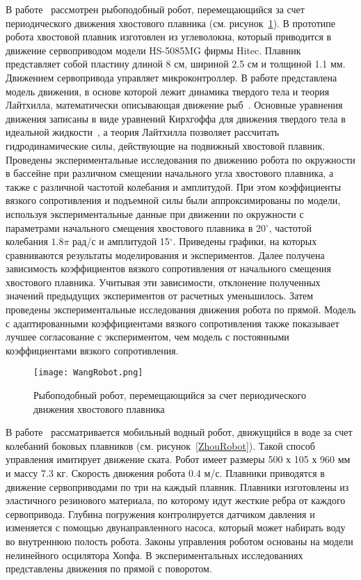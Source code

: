 В работе~\cite{Wang_Tan} рассмотрен рыбоподобный робот, перемещающийся за счет периодического движения хвостового плавника (см. рисунок~\ref{WangRobot}). В прототипе робота хвостовой плавник изготовлен из углеволокна, который приводится в движение сервоприводом модели HS-5085MG фирмы Hitec. Плавник представляет собой пластину длиной 8 см, шириной 2.5 см и толщиной 1.1 мм. Движением сервопривода управляет микроконтроллер. В работе представлена модель движения, в основе которой лежит  динамика твердого тела и теория Лайтхилла, математически описывающая движение рыб~\cite{Lighthill_1970}. Основные уравнения движения записаны в виде уравнений Кирхгоффа для движения твердого тела в идеальной жидкости~\cite{Kirchhoff}, а теория Лайтхилла позволяет рассчитать гидродинамические силы, действующие на подвижный хвостовой плавник. Проведены экспериментальные исследования по движению робота по окружности в бассейне при различном смещении начального угла хвостового плавника, а также с различной частотой колебания и амплитудой. При этом коэффициенты вязкого сопротивления и подъемной силы были аппроксимированы по модели, используя экспериментальные данные при движении по окружности с параметрами начального смещения хвостового плавника в 20$^\circ$, частотой колебания $1.8\pi$ рад/с и амплитудой 15$^\circ$. Приведены графики, на которых сравниваются результаты моделирования и экспериментов. Далее получена зависимость коэффициентов вязкого сопротивления от начального смещения хвостового плавника. Учитывая эти зависимости, отклонение полученных значений предыдущих экспериментов от расчетных уменьшилось. Затем проведены экспериментальные исследования движения робота по прямой. Модель с адаптированными коэффициентами вязкого сопротивления также показывает лучшее согласование с экспериментом, чем модель с постоянными коэффициентами вязкого сопротивления.

\begin{figure}[h]
	\centering
	\texttt{[image: WangRobot.png]}%
	\caption{Рыбоподобный робот, перемещающийся за счет периодического движения хвостового плавника}
	\label{WangRobot}
\end{figure}

В работе~\cite{Zhou_2011} рассматривается мобильный водный робот, движущийся в воде за счет колебаний боковых плавников (см. рисунок~\ref{ZhouRobot}). Такой способ управления имитирует движение ската. Робот имеет размеры 500 х 105 х 960 мм и массу 7.3 кг. Скорость движения робота 0.4 м/с. Плавники приводятся в движение сервоприводами по три на каждый плавник. Плавники изготовлены из эластичного резинового материала, по которому идут жесткие ребра от каждого сервопривода. Глубина погружения контролируется датчиком давления и изменяется с помощью двунаправленного насоса, который может набирать воду во внутреннюю полость робота. Законы управления роботом основаны на модели нелинейного осцилятора Хопфа. В экспериментальных исследованиях представлены движения по прямой с поворотом. %

